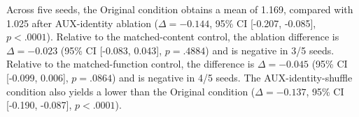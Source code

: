 Across five seeds, the Original condition obtains a mean \cps{} of 1.169, compared with 1.025 after AUX-identity ablation ($\Delta=-0.144$, 95\% CI [-0.207, -0.085], $p<.0001$). Relative to the matched-content control, the ablation difference is $\Delta=-0.023$ (95\% CI [-0.083, 0.043], $p=.4884$) and is negative in 3/5 seeds. Relative to the matched-function control, the difference is $\Delta=-0.045$ (95\% CI [-0.099, 0.006], $p=.0864$) and is negative in 4/5 seeds. The AUX-identity-shuffle condition also yields a lower \cps{} than the Original condition ($\Delta=-0.137$, 95\% CI [-0.190, -0.087], $p<.0001$).
